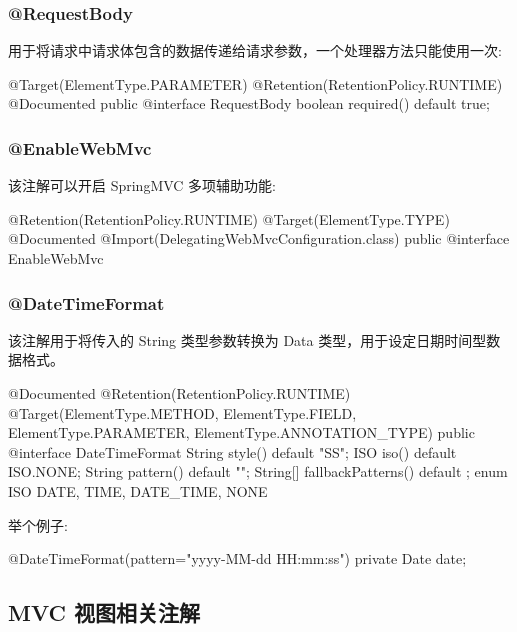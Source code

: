 \subsubsection{@RequestBody}

用于将请求中请求体包含的数据传递给请求参数，一个处理器方法只能使用一次:

\begin{Java}
@Target(ElementType.PARAMETER)
@Retention(RetentionPolicy.RUNTIME)
@Documented
public @interface RequestBody {
    boolean required() default true;
}
\end{Java}


\subsubsection{@EnableWebMvc}

该注解可以开启 SpringMVC 多项辅助功能:

\begin{Java}
@Retention(RetentionPolicy.RUNTIME)
@Target(ElementType.TYPE)
@Documented
@Import(DelegatingWebMvcConfiguration.class)
public @interface EnableWebMvc { }
\end{Java}

\subsubsection{@DateTimeFormat}

该注解用于将传入的 String 类型参数转换为 Data 类型，用于设定日期时间型数据格式。

\begin{Java}
@Documented
@Retention(RetentionPolicy.RUNTIME)
@Target({ElementType.METHOD, ElementType.FIELD, ElementType.PARAMETER, ElementType.ANNOTATION_TYPE})
public @interface DateTimeFormat {
    String style() default "SS";
    ISO iso() default ISO.NONE;
    String pattern() default "";
    String[] fallbackPatterns() default {};
    enum ISO { DATE, TIME, DATE_TIME, NONE }
}    
\end{Java}

举个例子:

\begin{Java}
@DateTimeFormat(pattern="yyyy-MM-dd HH:mm:ss")
private Date date;
\end{Java}

\subsection{MVC 视图相关注解}

